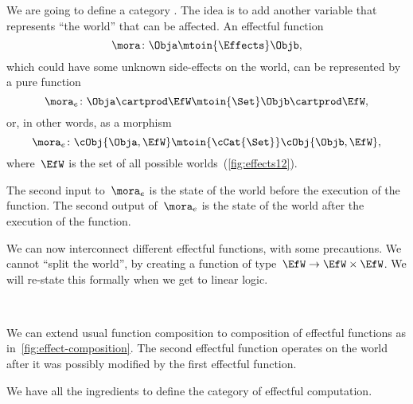 We are going to define a category \Effects.
The idea is to add another variable that represents ``the world'' that can be affected.
An effectful function
%
\begin{equation}
    \mora\colon \Obja \mtoin{\Effects} \Objb,
\end{equation}
%
which could have some unknown side-effects on the world, can be represented by a pure function
\begin{equation}
    \mora_e\colon  \Obja  \cartprod \EfW \mtoin{\Set}   \Objb \cartprod \EfW,
\end{equation}
or, in other words, as a morphism
\begin{equation}
    \mora_e\colon  \cObj{\Obja,\EfW} \mtoin{\cCat{\Set}}   \cObj{\Objb, \EfW},
\end{equation}
%
where~$\EfW$ is the set of all possible worlds~(\cref{fig:effects12}).

The second input to~$\mora_e$ is the state of the world before the execution of the function.
The second output of~$\mora_e$ is the state of the world after the execution of the function.

We can now interconnect different effectful functions, with some precautions.
We cannot ``split the world'', by creating a function of type~$\EfW \to  \EfW \times \EfW$.
We will re-state this formally when we get to linear logic.

\begin{marginfigure}
    \centering
    \\
    \caption{}
    \label{fig:effect-composition}
\end{marginfigure}

We can extend usual function composition to composition of effectful functions as in~\cref{fig:effect-composition}.
The second effectful function operates on the world after it was possibly modified by the first effectful function.

We have all the ingredients to define the category \Effects of effectful computation.

